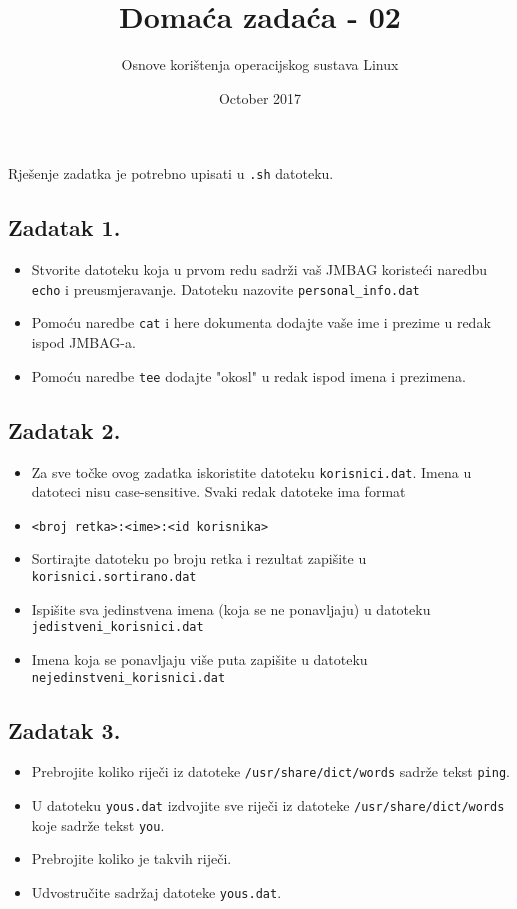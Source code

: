 \documentclass{exam}
\author{Osnove korištenja operacijskog sustava Linux}
\date{October 2017}
\newcommand{\shell}[1]{\texttt{#1}}
\begin{document}
\title{Domaća zadaća - 02}
\maketitle
Rješenje zadatka je potrebno upisati u \shell{.sh} datoteku.


\subsection*{Zadatak 1.}
  \begin{itemize}
    \item Stvorite datoteku koja u prvom redu sadrži vaš JMBAG koristeći naredbu \texttt{echo} i preusmjeravanje. Datoteku nazovite \texttt{personal\_info.dat}
    \item Pomoću naredbe \texttt{cat} i here dokumenta dodajte vaše ime i prezime u redak ispod JMBAG-a.
    \item Pomoću naredbe \shell{tee} dodajte "okosl" u redak ispod imena i prezimena.  
\end{itemize}

  \subsection*{Zadatak 2.}
  \begin{itemize}
    \item[] Za sve točke ovog zadatka iskoristite datoteku \texttt{korisnici.dat}. Imena u datoteci nisu case-sensitive. Svaki redak datoteke ima format
    \item[] \texttt{<broj retka>:<ime>:<id korisnika>}
    \item Sortirajte datoteku po broju retka i rezultat zapišite u \texttt{korisnici.sortirano.dat}
    \item Ispišite sva jedinstvena imena (koja se ne ponavljaju) u datoteku\\\texttt{jedistveni\_korisnici.dat}
    \item Imena koja se ponavljaju više puta zapišite u datoteku\\\texttt{nejedinstveni\_korisnici.dat}
  \end{itemize}
  \subsection*{Zadatak 3.}
  \begin{itemize}
  	\item Prebrojite koliko riječi iz datoteke \texttt{/usr/share/dict/words} sadrže tekst \shell{ping}.
  	\item U datoteku \texttt{yous.dat} izdvojite sve riječi iz datoteke \texttt{/usr/share/dict/words} koje sadrže tekst \shell{you}.
  	\item Prebrojite koliko je takvih riječi.
  	\item Udvostručite sadržaj datoteke \texttt{yous.dat}.
  \end{itemize}
\end{document}
